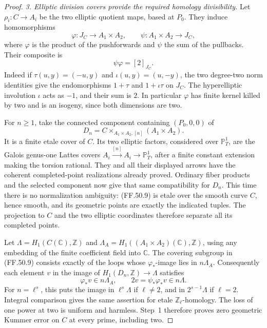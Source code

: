 \begin{proof}
\emph{3. Elliptic division covers provide the required
homology divisibility.}
Let \(\rho_i:C\to A_i\) be the two elliptic quotient
maps, based at \(P_0\). They induce homomorphisms
\[
 \varphi:J_C\longrightarrow A_1\times A_2,
 \qquad
 \psi:A_1\times A_2\longrightarrow J_C,
                                                        \tag{FF.50.7}
\]
where \(\varphi\) is the product of the pushforwards
and \(\psi\) the sum of the pullbacks. Their composite
is
\[
                              \psi\varphi=[2]_{J_C}.
                                                        \tag{FF.50.8}
\]
Indeed if \(\tau(u,y)=(-u,y)\) and
\(\iota(u,y)=(u,-y)\), the two degree-two norm
identities give the endomorphisms \(1+\tau\) and
\(1+\iota\tau\) on \(J_C\). The hyperelliptic
involution \(\iota\) acts as \(-1\), and their
sum is \(2\). In particular \(\varphi\) has
finite kernel killed by two and is an isogeny,
since both dimensions are two.

For \(n\geq1\), take the connected component
containing \((P_0,0,0)\) of
\[
 D_n=C\mathbin{\times_{A_1\times A_2,[n]}}
                                  (A_1\times A_2).
                                                        \tag{FF.50.9}
\]
It is a finite etale cover of \(C\). Its two elliptic
factors, considered over \(\mathbb P^1_T\), are
the Galois genus-one Lattes covers
\(A_i\xrightarrow{[n]}A_i\to\mathbb P^1_T\),
after a finite constant extension making the torsion
rational. They and all their displayed arrows have
the coherent completed-point realizations already
proved. Ordinary fiber products and the selected
component now give that same compatibility for
\(D_n\). This time there is no normalization
ambiguity: (FF.50.9) is etale over the smooth curve
\(C\), hence smooth, and its geometric points are
exactly the indicated tuples. The projection to
\(C\) and the two elliptic coordinates therefore
separate all its completed points.

Let \(\Lambda=H_1(C(\mathbb C),\mathbb Z)\) and
\(\Lambda_A=H_1((A_1\times A_2)(\mathbb C),\mathbb Z)\),
using any embedding of the finite coefficient field
into \(\mathbb C\). The covering subgroup in
(FF.50.9) consists exactly of the loops whose
\(\varphi_*\)-image lies in \(n\Lambda_A\).
Consequently each element \(v\) in the image of
\(H_1(D_n,\mathbb Z)\to\Lambda\) satisfies
\[
                 \varphi_*v\in n\Lambda_A,
                 \qquad 2v=\psi_*\varphi_*v\in n\Lambda.
                                                        \tag{FF.50.10}
\]
For \(n=\ell^s\), this puts the image in
\(\ell^s\Lambda\) if \(\ell\ne2\), and in
\(2^{s-1}\Lambda\) if \(\ell=2\). Integral
comparison gives the same assertion for etale
\(\mathbb Z_\ell\)-homology. The loss of one power
at two is uniform and harmless. Step~1 therefore
proves zero geometric Kummer error on \(C\) at
every prime, including two.


\end{proof}
